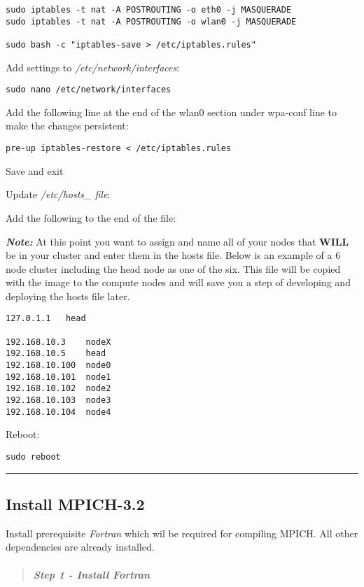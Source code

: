\documentclass[]{article}
\let\oldsubparagraph\subparagraph
\renewcommand{\subparagraph}[1]{\oldsubparagraph{#1}\mbox{}}
\begin{document}
\begin{verbatim}
sudo iptables -t nat -A POSTROUTING -o eth0 -j MASQUERADE
sudo iptables -t nat -A POSTROUTING -o wlan0 -j MASQUERADE

sudo bash -c "iptables-save > /etc/iptables.rules"
\end{verbatim}

Add settings to \emph{/etc/network/interfaces}:

\texttt{sudo\ nano\ /etc/network/interfaces}

Add the following line at the end of the wlan0 section under wpa-conf
line to make the changes persistent:

\texttt{pre-up\ iptables-restore\ \textless{}\ /etc/iptables.rules}

Save and exit

Update \emph{/etc/hosts\_ file}:

Add the following to the end of the file:

\emph{\textbf{Note:}} At this point you want to assign and name all of
your nodes that \textbf{WILL} be in your cluster and enter them in the
hosts file. Below is an example of a 6 node cluster including the head
node as one of the six. This file will be copied with the image to the
compute nodes and will save you a step of developing and deploying the
hosts file later.

\begin{verbatim}
127.0.1.1   head

192.168.10.3    nodeX
192.168.10.5    head
192.168.10.100  node0
192.168.10.101  node1
192.168.10.102  node2
192.168.10.103  node3
192.168.10.104  node4
\end{verbatim}

Reboot:

\texttt{sudo\ reboot}

\begin{center}\rule{0.5\linewidth}{\linethickness}\end{center}

\subsection{Install MPICH-3.2}\label{install-mpich-3.2}

Install prerequisite \emph{Fortran} which wil be required for compiling
MPICH. All other dependencies are already installed.

\begin{quote}
\mbox{}%
\subparagraph{Step 1 - Install Fortran}\label{step-1---install-fortran}
\end{quote}
\end{document}
